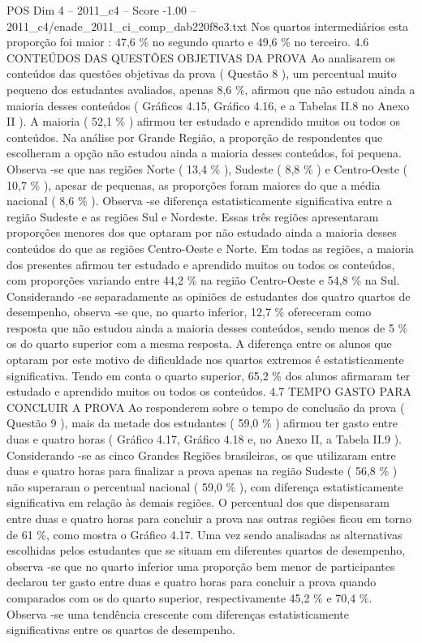 \begin{textsample}{POS Dim 4 – 2011\_c4 – Score -1.00 – 2011\_c4/enade\_2011\_ci\_comp\_dab220f8e3.txt}
Nos quartos intermediários esta proporção foi maior : 47,6 \% no segundo quarto e 49,6 \% no terceiro. 4.6 CONTEÚDOS DAS QUESTÕES OBJETIVAS DA PROVA Ao analisarem os conteúdos das questões objetivas da prova ( Questão 8 ), um percentual muito pequeno dos estudantes avaliados, apenas 8,6 \%, afirmou que não estudou ainda a maioria desses conteúdos ( Gráficos 4.15, Gráfico 4.16, e a Tabelas II.8 no Anexo II ).
A maioria ( 52,1 \% ) afirmou ter estudado e aprendido muitos ou todos os conteúdos.
Na análise por Grande Região, a proporção de respondentes que escolheram a opção não estudou ainda a maioria desses conteúdos, foi pequena.
Observa -se que nas regiões Norte ( 13,4 \% ), Sudeste ( 8,8 \% ) e Centro-Oeste ( 10,7 \% ), apesar de pequenas, as proporções foram maiores do que a média nacional ( 8,6 \% ).
Observa -se diferença estatisticamente significativa entre a região Sudeste e as regiões Sul e Nordeste.
Essas três regiões apresentaram proporções menores dos que optaram por não estudado ainda a maioria desses conteúdos do que as regiões Centro-Oeste e Norte.
Em todas as regiões, a maioria dos presentes afirmou ter estudado e aprendido muitos ou todos os conteúdos, com proporções variando entre 44,2 \% na região Centro-Oeste e 54,8 \% na Sul.
Considerando -se separadamente as opiniões de estudantes dos quatro quartos de desempenho, observa -se que, no quarto inferior, 12,7 \% ofereceram como resposta que não estudou ainda a maioria desses conteúdos, sendo menos de 5 \% os do quarto superior com a mesma resposta.
A diferença entre os alunos que optaram por este motivo de dificuldade nos quartos extremos é estatisticamente significativa.
Tendo em conta o quarto superior, 65,2 \% dos alunos afirmaram ter estudado e aprendido muitos ou todos os conteúdos. 4.7 TEMPO GASTO PARA CONCLUIR A PROVA Ao responderem sobre o tempo de conclusão da prova ( Questão 9 ), mais da metade dos estudantes ( 59,0 \% ) afirmou ter gasto entre duas e quatro horas ( Gráfico 4.17, Gráfico 4.18 e, no Anexo II, a Tabela II.9 ).
Considerando -se as cinco Grandes Regiões brasileiras, os que utilizaram entre duas e quatro horas para finalizar a prova apenas na região Sudeste ( 56,8 \% ) não superaram o percentual nacional ( 59,0 \% ), com diferença estatisticamente significativa em relação às demais regiões.
O percentual dos que dispensaram entre duas e quatro horas para concluir a prova nas outras regiões ficou em torno de 61 \%, como mostra o Gráfico 4.17.
Uma vez sendo analisadas as alternativas escolhidas pelos estudantes que se situam em diferentes quartos de desempenho, observa -se que no quarto inferior uma proporção bem menor de participantes declarou ter gasto entre duas e quatro horas para concluir a prova quando comparados com os do quarto superior, respectivamente 45,2 \% e 70,4 \%.
Observa -se uma tendência crescente com diferenças estatisticamente significativas entre os quartos de desempenho.

\end{textsample}
